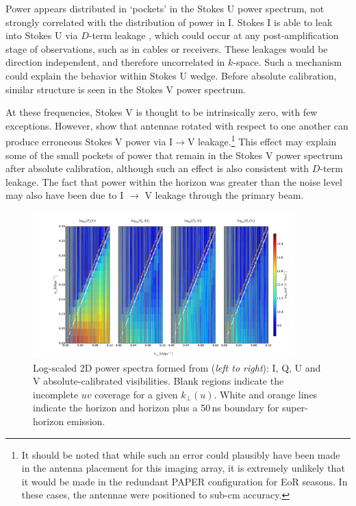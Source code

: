 Power appears distributed in `pockets' in the Stokes U power spectrum, not strongly correlated with the distribution of power in I. Stokes I is able to leak into Stokes U via $D$-term leakage \citep{TMS, Geil.11}, which could occur at any post-amplification stage of observations, such as in cables or receivers. These leakages would be direction independent, and therefore uncorrelated in $k$-space. Such a mechanism could explain the behavior within Stokes U wedge. Before absolute calibration, similar structure is seen in the Stokes V power spectrum.

At these frequencies, Stokes V is thought to be intrinsically zero, with few exceptions. However, \citet{HBS.1.96} show that antennae rotated with respect to one another can produce erroneous Stokes V power via I$\rightarrow$V leakage.\footnote{
It should be noted that while such an error could plausibly have been made in the antenna placement for this imaging array, it is extremely unlikely that it would be made in the redundant PAPER configuration for EoR seasons. In these cases, the antennae were positioned to sub-cm accuracy.} This effect may explain some of the small pockets of power that remain in the Stokes V power spectrum after absolute calibration, although such an effect is also consistent with $D$-term leakage. The fact that power within the horizon was greater than the noise level may also have been due to I $\rightarrow$ V leakage through the primary beam.

\begin{figure}
\centering
\includegraphics[width=0.9\textwidth]{chapters/eor_window_PAPER/figures/wedges_final_vmin9_greybg.pdf}
\caption[Wedge power spectra from PAPER-32.]{Log-scaled 2D power spectra formed from (\textit{left to right}): I, Q, U and V absolute-calibrated visibilities. Blank regions indicate the incomplete $uv$ coverage for a given $k_{\perp}(u)$. White and orange lines indicate the horizon and horizon plus a 50\,ns boundary for super-horizon emission. }
\label{fig:psa32_wedges}
\end{figure}

